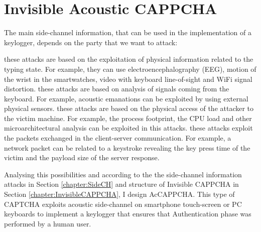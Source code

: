 \chapter{Invisible Acoustic CAPPCHA}
The main side-channel information, that can be used in the implementation of a keylogger, depends on the party that we want to attack\cite{keylogging}:
\begin{itemize}
{these attacks are based on the exploitation of physical information related to the typing state. For example, they can use electroencephalography (EEG), motion of the wrist in the smartwatches, video with keyboard line-of-sight and WiFi signal distortion. }
{these attacks are based on analysis of signals coming from the keyboard. For example, acoustic emanations can be exploited by using external physical sensors.}
{these attacks are based on the physical access of the attacker to the victim machine. For example, the process footprint, the CPU load and other microarchitectural analysis can be exploited in this attacks.}
{these attacks exploit the packets exchanged in the client-server communication. For example, a network packet can be related to a keystroke revealing the key press time of the victim and the payload size of the server response.}
\end{itemize}
Analysing this possibilities and according to the the side-channel information attacks in Section \ref{chapter:SideCH} and structure of Invisible CAPPCHA in Section \ref{chapter:InvisibleCAPPCHA}, I design AcCAPPCHA. This type of CAPTCHA exploits acoustic side-channel on smartphone touch-screen or PC keyboards to implement a keylogger that ensures that Authentication phase was performed by a human user.